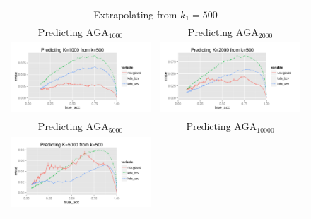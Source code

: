 \documentclass[twoside,11pt]{article}
\newenvironment{myfont}{\fontfamily{phv}\selectfont}{\par}
\begin{document}
\begin{figure}
\centering
\begin{tabular}{cc}
\multicolumn{2}{c}{\begin{myfont}Extrapolating from $k_1 = 500$\end{myfont}}\\
\begin{myfont}Predicting $\text{AGA}_{1000}$\end{myfont} &
\begin{myfont}Predicting $\text{AGA}_{2000}$\end{myfont}\\
\includegraphics[scale = 0.55, clip = true, trim = 0 0 1.25in 0.45in]{sim_large7_K1_k0_5.png} &
\includegraphics[scale = 0.55, clip = true, trim = 0 0 0 0.45in]{sim_large7_K2_k0_5.png}\\
\begin{myfont}Predicting $\text{AGA}_{5000}$\end{myfont} &
\begin{myfont}Predicting $\text{AGA}_{10000}$\end{myfont}\\
\includegraphics[scale = 0.55, clip = true, trim = 0 0 1.25in 0.45in]{sim_large7_K5_k0_5.png} &

\end{tabular}
\end{figure}
\end{document}
